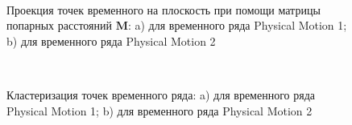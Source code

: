 \begin{figure}[h!t]\center
{}
\\
\caption{Проекция точек временного на плоскость при помощи матрицы попарных расстояний $\textbf{M}$: a) для временного ряда Physical Motion 1; b) для временного ряда Physical Motion 2}
\label{fig_real_2D}
\end{figure}

\begin{figure}[h!t]\center
{}
\\
\caption{Кластеризация точек временного ряда: 
a) для временного ряда Physical Motion 1; b) для временного ряда Physical Motion 2}
\label{fig_real_claster}
\end{figure}

